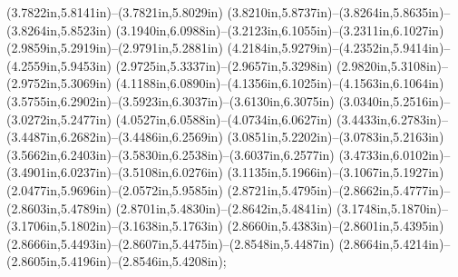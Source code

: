 (3.7822in,5.8141in)--(3.7821in,5.8029in) (3.8210in,5.8737in)--(3.8264in,5.8635in)--(3.8264in,5.8523in) (3.1940in,6.0988in)--(3.2123in,6.1055in)--(3.2311in,6.1027in) (2.9859in,5.2919in)--(2.9791in,5.2881in) (4.2184in,5.9279in)--(4.2352in,5.9414in)--(4.2559in,5.9453in) (2.9725in,5.3337in)--(2.9657in,5.3298in) (2.9820in,5.3108in)--(2.9752in,5.3069in) (4.1188in,6.0890in)--(4.1356in,6.1025in)--(4.1563in,6.1064in) (3.5755in,6.2902in)--(3.5923in,6.3037in)--(3.6130in,6.3075in) (3.0340in,5.2516in)--(3.0272in,5.2477in) (4.0527in,6.0588in)--(4.0734in,6.0627in) (3.4433in,6.2783in)--(3.4487in,6.2682in)--(3.4486in,6.2569in) (3.0851in,5.2202in)--(3.0783in,5.2163in) (3.5662in,6.2403in)--(3.5830in,6.2538in)--(3.6037in,6.2577in) (3.4733in,6.0102in)--(3.4901in,6.0237in)--(3.5108in,6.0276in) (3.1135in,5.1966in)--(3.1067in,5.1927in) (2.0477in,5.9696in)--(2.0572in,5.9585in) (2.8721in,5.4795in)--(2.8662in,5.4777in)--(2.8603in,5.4789in) (2.8701in,5.4830in)--(2.8642in,5.4841in) (3.1748in,5.1870in)--(3.1706in,5.1802in)--(3.1638in,5.1763in) (2.8660in,5.4383in)--(2.8601in,5.4395in) (2.8666in,5.4493in)--(2.8607in,5.4475in)--(2.8548in,5.4487in) (2.8664in,5.4214in)--(2.8605in,5.4196in)--(2.8546in,5.4208in);
